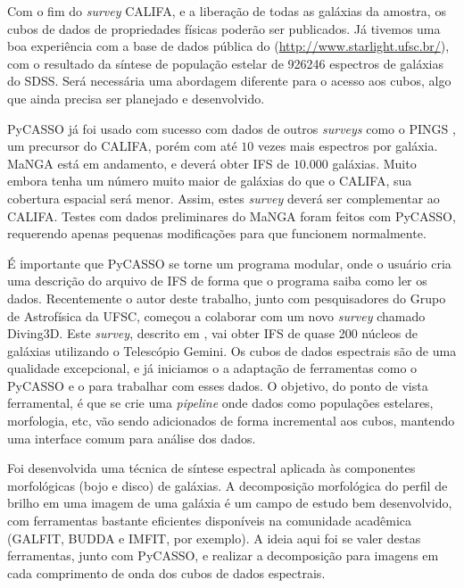 Com o fim do {\em survey} CALIFA, e a liberação de todas as galáxias da amostra,
os cubos de dados de propriedades físicas poderão ser publicados. Já tivemos uma
boa experiência com a base de dados pública do \starlight
(\url{http://www.starlight.ufsc.br/}), com o resultado da síntese de população
estelar de 926246 espectros de galáxias do SDSS. Será necessária uma abordagem
diferente para o acesso aos cubos, algo que ainda precisa ser planejado e
desenvolvido.

PyCASSO já foi usado com sucesso com dados de outros {\em surveys} como o PINGS
\citep{RosalesOrtega2010}, um precursor do CALIFA, porém com até $10$ vezes mais
espectros por galáxia. MaNGA \citep{Bundy2015} está em andamento, e deverá obter
IFS de $10.000$ galáxias. Muito embora tenha um número muito maior de galáxias
do que o CALIFA, sua cobertura espacial será menor. Assim, estes {\em survey}
deverá ser complementar ao CALIFA. Testes com dados preliminares do MaNGA foram
feitos com PyCASSO, requerendo apenas pequenas modificações para que funcionem
normalmente.

É importante que PyCASSO se torne um programa modular, onde o usuário cria uma
descrição do arquivo de IFS de forma que o programa saiba como ler os dados.
Recentemente o autor deste trabalho, junto com pesquisadores do Grupo de
Astrofísica da UFSC, começou a colaborar com um novo {\em survey} chamado
Diving3D. Este {\em survey}, descrito em \citet{Ricci2014}, vai obter IFS de
quase 200 núcleos de galáxias utilizando o Telescópio Gemini. Os cubos de dados
espectrais são de uma qualidade excepcional, e já iniciamos o a adaptação de
ferramentas como o PyCASSO e o \starlight para trabalhar com esses dados. O
objetivo, do ponto de vista ferramental, é que se crie uma {\em pipeline} onde
dados como populações estelares, morfologia, etc, vão sendo adicionados de forma
incremental aos cubos, mantendo uma interface comum para análise dos dados.

Foi desenvolvida uma técnica de síntese espectral aplicada às componentes
morfológicas (bojo e disco) de galáxias. A decomposição morfológica do perfil de
brilho em uma imagem de uma galáxia é um campo de estudo bem desenvolvido, com
ferramentas bastante eficientes disponíveis na comunidade acadêmica (GALFIT,
BUDDA e IMFIT, por exemplo). A ideia aqui foi se valer destas ferramentas, junto
com PyCASSO, e realizar a decomposição para imagens em cada comprimento de onda
dos cubos de dados espectrais.

